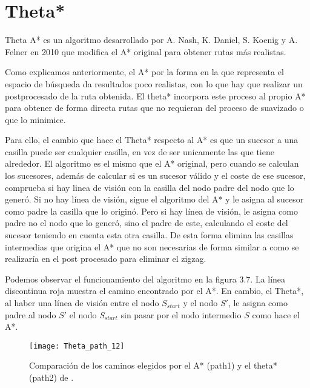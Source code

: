 \newpage

\section{Theta*} \label{referenciaTheta}
Theta A* es un algoritmo desarrollado por A. Nash, K. Daniel, S. Koenig y A. Felner \cite{thetaestrella, thetaestrellaweb} en 2010 que modifica el A* original para obtener rutas más realistas.

Como explicamos anteriormente, el A* por la forma en la que representa el espacio de búsqueda da resultados poco realistas, con lo que hay que realizar un postprocesado de la ruta obtenida. El theta* incorpora este proceso al propio A* para obtener de forma directa rutas que no requieran del proceso de suavizado o que lo minimice.

Para ello, el cambio que hace el Theta* respecto al A* es que un sucesor a una casilla puede ser cualquier casilla, en vez de ser unicamente las que tiene alrededor. El algoritmo es el mismo que el A* original, pero cuando se calculan los sucesores, además de calcular si es un sucesor válido y el coste de ese sucesor, comprueba si hay linea de visión con la casilla del nodo padre del nodo que lo generó. Si no hay línea de visión, sigue el algoritmo del A* y le asigna al sucesor como padre la casilla que lo originó. Pero si hay línea de visión, le asigna como padre no el nodo que lo generó, sino el padre de este, calculando el coste del sucesor teniendo en cuenta esta otra casilla. De esta forma elimina las casillas intermedias que origina el A* que no son necesarias de forma similar a como se realizaría en el post procesado para eliminar el zigzag.

Podemos observar el funcionamiento del algoritmo en la figura 3.7. La línea discontinua roja muestra el camino encontrado por el A*. En cambio, el Theta*, al haber una línea de visión entre el nodo $S_{start}$ y el nodo $S'$, le asigna como padre al nodo $S'$ el nodo $S_{start}$ sin pasar por el nodo intermedio $S$ como hace el A*.

\begin{figure}[htpb]
    \centering
    \texttt{[image: Theta\_path\_12]}
    \caption[Comparación de los caminos elegidos por el A* y el Theta*]{Comparación de los caminos elegidos por el A* (path1) y el theta* (path2) de \cite{thetaestrellawebimagen}.}
    \label{fig:basics AFM sketch}
\end{figure}

